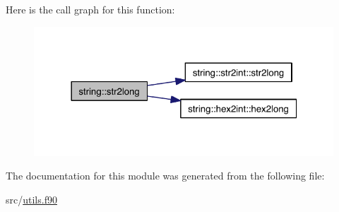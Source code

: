 Here is the call graph for this function\-:
\nopagebreak
\begin{figure}[H]
\begin{center}
\leavevmode
\includegraphics[width=322pt]{classstring_aefd9037a03dddf650cb9d0a18ed7de95_cgraph}
\end{center}
\end{figure}




The documentation for this module was generated from the following file\-:\begin{DoxyCompactItemize}
\item 
src/\hyperlink{utils_8f90}{utils.\-f90}\end{DoxyCompactItemize}
